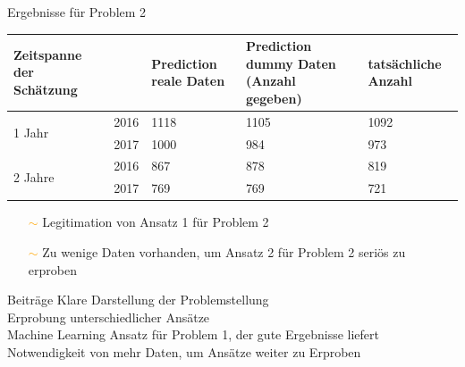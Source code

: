\documentclass[17pt, fleqn]{beamer}
\begin{document}
\begin{frame}{Ergebnisse für Problem 2}
    \scriptsize{
    \begin{table}[ht]
        \begin{tabular}{ p{1cm} p{0.5cm} p{2cm} p{2.5cm} p{2cm} }
          Zeitspanne der Sch\"atzung &      & Prediction reale Daten & Prediction dummy Daten (Anzahl gegeben) & tats\"achliche Anzahl \\
          \hline
          \multirow{2}{3em}{1 Jahr}
                                     & 2016 & 1118                   & 1105                                    & 1092                  \\
                                     & 2017 & 1000                   & 984                                     & 973                   \\
          \hline
          \multirow{2}{4em}{2 Jahre}
                                     & 2016 & 867                    & 878                                     & 819                   \\
                                     & 2017 & 769                    & 769                                     & 721                   \\
      
          \hline
        \end{tabular}
      \end{table}
    } \pause
    \small{
    \begin{itemize}
        \item[\textcolor{orange}{$\sim$}] Legitimation von Ansatz 1 für Problem 2 \pause
        \item[\textcolor{orange}{$\sim$}] Zu wenige Daten vorhanden, um Ansatz 2 für Problem 2 seriös zu erproben
    \end{itemize}
    }
\end{frame}

\begin{frame}{Beiträge}
    Klare Darstellung der Problemstellung \\[1cm]
    \pause
    Erprobung unterschiedlicher Ansätze \\[1cm]
    \pause
    Machine Learning Ansatz für Problem 1, der gute Ergebnisse liefert \\[1cm]
    \pause
    Notwendigkeit von mehr Daten, um Ansätze weiter zu Erproben
    
\end{frame}
\end{document}
